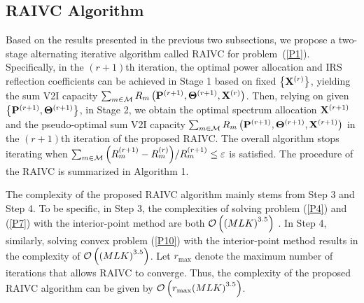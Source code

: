 \documentclass[journal]{IEEEtran}
\begin{document}


\subsection{RAIVC Algorithm}
Based on the results presented in the previous two subsections, we propose a two-stage alternating iterative algorithm called RAIVC for problem~(\ref{P1}). Specifically, in the $(r+1)$th iteration, the optimal power allocation and IRS reflection coefficients can be achieved in Stage 1 based on fixed $ \left\{ {{{\bf{X}}^{\left( r \right)}}} \right\} $, yielding the sum V2I capacity $  \sum\nolimits_{m \in {\cal M}} {{R_m}\left( {{{\bf{P}}^{\left( {r + 1} \right)}},{{\bf{\Theta}} ^{\left( {r + 1} \right)}},{{\bf{X}}^{\left( r \right)}}} \right)}  $. Then, relying on given $ \left\{ {{{\bf{P}}^{\left( {r + 1} \right)}},{{\bf{\Theta }}^{\left( {r + 1} \right)}}} \right\} $, in Stage 2, we obtain the optimal spectrum allocation $ {{{\bf{X}}^{\left( r+1 \right)}}} $ and the pseudo-optimal sum V2I capacity $ \sum\nolimits_{m \in {\cal M}} {{R_m}\left( {{{\bf{P}}^{\left( {r + 1} \right)}},{{\bf{\Theta}} ^{\left( {r + 1} \right)}},{{\bf{X}}^{\left( r+1 \right)}}} \right)}  $ in the $(r+1)$th iteration of the proposed RAIVC. The overall algorithm stops iterating when $ \sum\nolimits_{m \in {\cal M}} {\left( {R_m^{\left( {r + 1} \right)} - R_m^{\left( r \right)}} \right)} /R_m^{\left( {r + 1} \right)} \le \varepsilon $ is satisfied. The procedure of the RAIVC is summarized in Algorithm 1.

The complexity of the proposed RAIVC algorithm mainly stems from Step 3 and Step 4. To be specific, in Step 3, the complexities of solving problem (\ref{P4}) and (\ref{P7}) with the interior-point method are both $ {\cal O}\left( {{{\left( {MLK} \right)}^{3.5}}} \right) $ \cite{chen}. In Step 4, similarly, solving convex problem (\ref{P10}) with the interior-point method results in the complexity of $ {\cal O}\left( {{{\left( {MLK} \right)}^{3.5}}} \right) $. Let $ {r_{\max }} $ denote the maximum number of iterations that allows RAIVC to converge. Thus, the complexity of the proposed RAIVC algorithm can be given by $ {\cal O}\left( {{r_{\max }}{{\left( {MLK} \right)}^{3.5}}} \right)$. 
\end{document}
